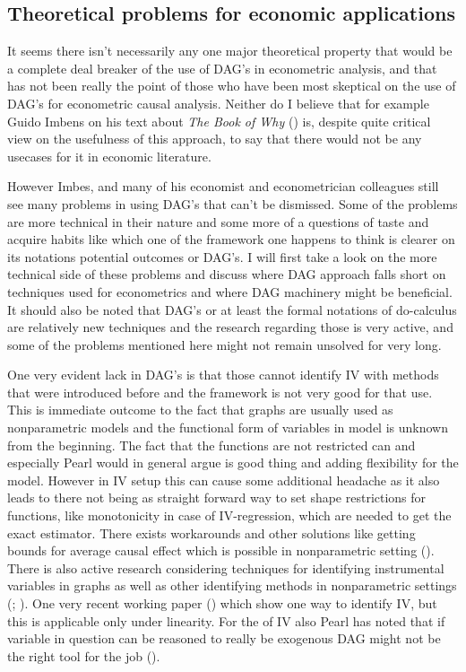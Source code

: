\documentclass[main=english,12pt,a4paper,pdftex,econ,utf8]{aaltothesis}
\begin{document}
\subsection{Theoretical problems for economic applications}

It seems there isn't necessarily any one major theoretical property that would be a complete deal breaker of the use of DAG's in econometric analysis, and that has not been really the point of those who have been most skeptical on the use of DAG's for econometric causal analysis. Neither do I believe that for example Guido Imbens on his text about \textit{The Book of Why} (\cite{PearlMackenzie18}) is, despite quite critical view on the usefulness of this approach, to say that there would not be any usecases for it in economic literature.

However Imbes, and many of his economist and econometrician colleagues still see many problems in using DAG's that can't be dismissed. Some of the problems are more technical in their nature and some more of a questions of taste and acquire habits like which one of the framework one happens to think is clearer on its notations potential outcomes or DAG's. I will first take  a look on the more technical side of these problems and discuss where DAG approach falls short on techniques used for econometrics and where DAG machinery might be beneficial. It should also be noted that DAG's or at least the formal notations of do-calculus are relatively new techniques and the research regarding those is very active, and some of the problems mentioned here might not remain unsolved for very long.

One very evident lack in DAG's is that those cannot identify IV with methods that were introduced before and the framework is not very good for that use. This is immediate outcome to the fact that graphs are usually used as nonparametric models and the functional form of variables in model is unknown from the beginning. The fact that the functions are not restricted can and especially Pearl would in general argue is good thing and adding flexibility for the model. However in IV setup this can cause some additional headache as it also leads to there not being as straight forward way to set shape restrictions for functions, like monotonicity in case of IV-regression, which are needed to get the exact estimator. There exists workarounds and other solutions like getting bounds for average causal effect which is possible in nonparametric setting (\cite{Balke1997}). There is also active research considering techniques for identifying instrumental variables in graphs as well as other identifying methods in nonparametric settings (\cite{Freyberger2017}; \cite{Freyberger2015}). One very recent working paper (\cite{Hoveid2021}) which show one way to identify IV, but this is applicable only under linearity. For the of IV also Pearl has noted that if variable in question can be reasoned to really be exogenous DAG might not be the right tool for the job (\cite{PearlMackenzie18}).
\end{document}
